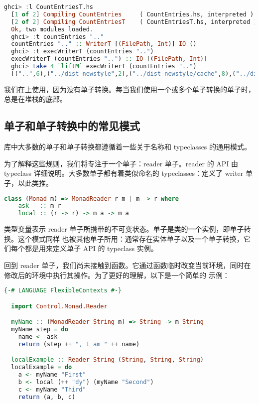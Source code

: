 \documentclass[./main.tex]{subfiles}
\begin{document}
\begin{lstlisting}[language=Haskell]
  ghci> :l CountEntriesT.hs
  [1 of 2] Compiling CountEntries     ( CountEntries.hs, interpreted )
  [2 of 2] Compiling CountEntriesT    ( CountEntriesT.hs, interpreted )
  Ok, two modules loaded.
  ghci> :t countEntries ".."
  countEntries ".." :: WriterT [(FilePath, Int)] IO ()
  ghci> :t execWriterT (countEntries "..")
  execWriterT (countEntries "..") :: IO [(FilePath, Int)]
  ghci> take 4 `liftM` execWriterT (countEntries "..")
  [("..",6),("../dist-newstyle",2),("../dist-newstyle/cache",8),("../dist-newstyle/tmp",0)]
\end{lstlisting}

我们在上使用，因为没有单子转换。每当我们使用一个或多个单子转换的单子时，总是在堆栈的底部。

\subsection*{单子和单子转换中的常见模式}

库中大多数的单子和单子转换都遵循着一些关于名称和 typeclasses 的通用模式。

为了解释这些规则，我们将专注于一个单子：reader 单子。reader 的 API 由 typeclass 详细说明。大多数单子都有着类似命名的
typeclasses：定义了 writer 单子，以此类推。

\begin{lstlisting}[language=Haskell]
  class (Monad m) => MonadReader r m | m -> r where
    ask   :: m r
    local :: (r -> r) -> m a -> m a
\end{lstlisting}

类型变量表示 reader 单子所携带的不可变状态。单子是类的一个实例，即单子转换。这个模式同样
也被其他单子所用：通常存在实体单子以及一个单子转换，它们每个都是用来定义单子 API 的 typeclass 实例。

回到 reader 单子，我们尚未接触到函数。它通过函数临时改变当前环境，同时在修改后的环境中执行其操作。为了更好的理解，以下是一个简单的
示例：

\begin{lstlisting}[language=Haskell]
  {-# LANGUAGE FlexibleContexts #-}

  import Control.Monad.Reader

  myName :: (MonadReader String m) => String -> m String
  myName step = do
    name <- ask
    return (step ++ ", I am " ++ name)

  localExample :: Reader String (String, String, String)
  localExample = do
    a <- myName "First"
    b <- local (++ "dy") (myName "Second")
    c <- myName "Third"
    return (a, b, c)
\end{lstlisting}
\end{document}
